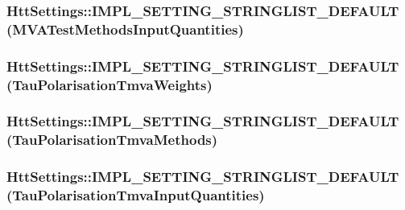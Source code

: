 \label{classHttSettings_a789b96782a5fc48e216ab8b19d39c099}
\hypertarget{classHttSettings_a35ce0fe901e69d374becbe5f16dc2789}{
\subsubsection[{IMPL\_\-SETTING\_\-STRINGLIST\_\-DEFAULT}]{\setlength{\rightskip}{0pt plus 5cm}HttSettings::IMPL\_\-SETTING\_\-STRINGLIST\_\-DEFAULT (MVATestMethodsInputQuantities)}}
\label{classHttSettings_a35ce0fe901e69d374becbe5f16dc2789}
\hypertarget{classHttSettings_a11d5b78375d1a35dd36ac11257384dc6}{
\subsubsection[{IMPL\_\-SETTING\_\-STRINGLIST\_\-DEFAULT}]{\setlength{\rightskip}{0pt plus 5cm}HttSettings::IMPL\_\-SETTING\_\-STRINGLIST\_\-DEFAULT (TauPolarisationTmvaWeights)}}
\label{classHttSettings_a11d5b78375d1a35dd36ac11257384dc6}
\hypertarget{classHttSettings_a5a3e870b39dd13d3859c9ec5f579a0a2}{
\subsubsection[{IMPL\_\-SETTING\_\-STRINGLIST\_\-DEFAULT}]{\setlength{\rightskip}{0pt plus 5cm}HttSettings::IMPL\_\-SETTING\_\-STRINGLIST\_\-DEFAULT (TauPolarisationTmvaMethods)}}
\label{classHttSettings_a5a3e870b39dd13d3859c9ec5f579a0a2}
\hypertarget{classHttSettings_a5ba7dd2259f54ac79ea4ca9c5f7690cf}{
\subsubsection[{IMPL\_\-SETTING\_\-STRINGLIST\_\-DEFAULT}]{\setlength{\rightskip}{0pt plus 5cm}HttSettings::IMPL\_\-SETTING\_\-STRINGLIST\_\-DEFAULT (TauPolarisationTmvaInputQuantities)}}
